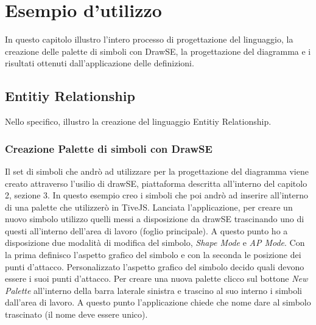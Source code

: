 \chapter{Esempio d'utilizzo}
    In questo capitolo illustro l'intero processo di progettazione del linguaggio, la creazione delle palette di simboli con DrawSE, la progettazione del diagramma e i risultati ottenuti dall'applicazione delle definizioni.

    \section{Entitiy Relationship}
        Nello specifico, illustro la creazione del linguaggio Entitiy Relationship.

        \subsection{Creazione Palette di simboli con DrawSE}
            Il set di simboli che andrò ad utilizzare per la progettazione del diagramma viene creato attraverso l'usilio di drawSE, piattaforma descritta all'interno del capitolo 2, sezione 3. In questo esempio creo i simboli che poi andrò ad inserire all'interno di una palette che utilizzerò in TiveJS.
            \newline
            Lanciata l'applicazione, per creare un nuovo simbolo utilizzo quelli messi a disposizione da drawSE trascinando uno di questi all'interno dell'area di lavoro (foglio principale). A questo punto ho a disposizione due modalità di modifica del simbolo, \textit{Shape Mode} e \textit{AP Mode}. Con la prima definisco l'aspetto grafico del simbolo e con la seconda le posizione dei punti d'attacco. Personalizzato l'aspetto grafico del simbolo decido quali devono essere i suoi punti d'attacco.
            \newline
            Per creare una nuova palette clicco sul bottone \textit{New Palette} all'interno della barra laterale sinistra e trascino al suo interno i simboli dall'area di lavoro. A questo punto l'applicazione chiede che nome dare al simbolo trascinato (il nome deve essere unico).

